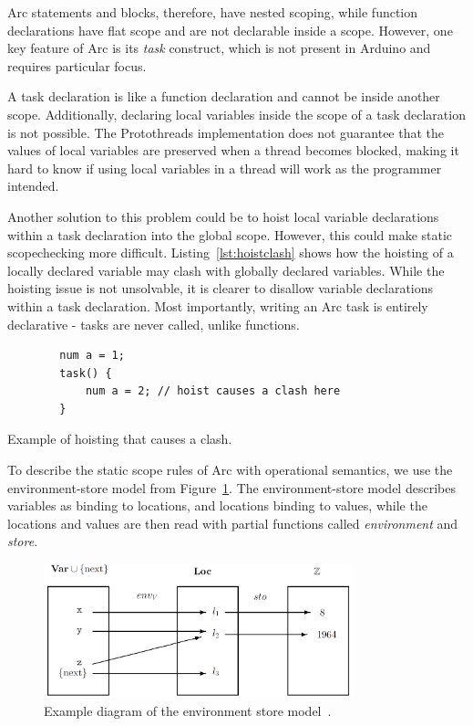 Arc statements and blocks, therefore, have nested scoping, while function declarations have flat scope and are not declarable inside a scope. However, one key feature of Arc is its \textit{task} construct, which is not present in Arduino and requires particular focus.

A task declaration is like a function declaration and cannot be inside another scope. Additionally, declaring local variables inside the scope of a task declaration is not possible. The Protothreads implementation does not guarantee that the values of local variables are preserved when a thread becomes blocked, making it hard to know if using local variables in a thread will work as the programmer intended.

Another solution to this problem could be to hoist local variable declarations within a task declaration into the global scope. However, this could make static scopechecking more difficult. Listing~\ref{lst:hoistclash} shows how the hoisting of a locally declared variable may clash with globally declared variables. While the hoisting issue is not unsolvable, it is clearer to disallow variable declarations within a task declaration. Most importantly, writing an Arc task is entirely declarative - tasks are never called, unlike functions.


\begin{listing}[htb!]
    \begin{verbatim}
        num a = 1;
        task() {
            num a = 2; // hoist causes a clash here
        }
    \end{verbatim}
    \caption{Example of hoisting that causes a clash.}
    \label{lst:hoistclash}
\end{listing}


To describe the static scope rules of Arc with operational semantics, we use the environment-store model from Figure~\ref{fig:envstomodel}. The environment-store model describes variables as binding to locations, and locations binding to values, while the locations and values are then read with partial functions called \textit{environment} and \textit{store}.


\begin{figure}[htb!]
    \centering
    \includegraphics[width=0.8\textwidth]{figures/Environment_Store.png}
    \caption{Example diagram of the environment store model~\cite{Huttel2010}.}
    \label{fig:envstomodel}
\end{figure}


